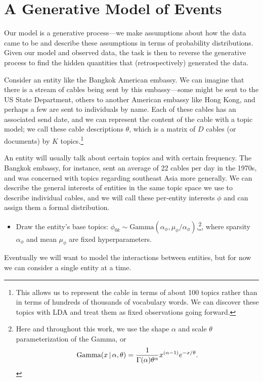 \section{A Generative Model of Events}
Our model is a generative process---we make assumptions about how the data came to be and describe these assumptions in terms of probability distributions.  Given our model and observed data, the task is then to reverse the generative process to find the hidden quantities that (retrospectively) generated the data.

Consider an entity like the Bangkok American embassy.  We can imagine that there is a stream of cables being sent by this embassy---some might be sent to the US State Department, others to another American embassy like Hong Kong, and perhaps a few are sent to individuals by name.  Each of these cables has an associated send date, and we can represent the content of the cable with a topic model; we call these cable descriptions $\theta$, which is a matrix of $D$ cables (or documents) by $K$ topics.\footnote{This allows us to represent the cable in terms of about 100 topics rather than in terms of hundreds of thousands of vocabulary words. We can discover these topics with LDA and treat them as fixed observations going forward.}

An entity will usually talk about certain topics and with certain frequency. The Bangkok embassy, for instance, sent an average of 22 cables per day in the 1970s, and was concerned with topics regarding southeast Asia more generally.  We can describe the general interests of entities in the same topic space we use to describe individual cables, and we will call these per-entity interests $\phi$ and can assign them a formal distribution.
\begin{itemize}
\item Draw the entity's base topics: $\phi_{0k} \sim \mbox{Gamma}(\alpha_\phi, \mu_\phi/\alpha_\phi)$,\footnote{Here and throughout this work, we use the shape $\alpha$ and scale $\theta$ parameterization of the Gamma, or \[\mbox{Gamma}(x \, | \, \alpha, \theta) = \frac{1}{\Gamma(\alpha) \theta^\alpha} x^{(\alpha-1)}e^{- x / \theta}.\]}, where sparsity $\alpha_\phi$ and mean $\mu_\phi$ are fixed hyperparameters.
\end{itemize}
Eventually we will want to model the interactions between entities, but for now we can consider a single entity at a time.

